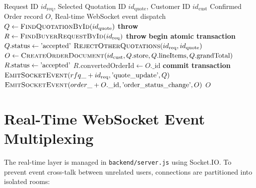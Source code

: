 \begin{algorithm}[H]
\caption{Atomic Concurrency-Controlled Quotation Acceptance}
\label{alg:atomic_acceptance}
\begin{algorithmic}[1]
\Require Request ID $id_{\text{req}}$, Selected Quotation ID $id_{\text{quote}}$, Customer ID $id_{\text{cust}}$
\Ensure Confirmed Order record $O$, Real-time WebSocket event dispatch
\State $Q \gets \textsc{FindQuotationById}(id_{\text{quote}})$
    \State \textbf{throw} 
\EndIf
\State $R \gets \textsc{FindBuyerRequestById}(id_{\text{req}})$
    \State \textbf{throw} 
\EndIf
\State \textbf{begin atomic transaction}
\State $Q.\text{status} \gets \text{\texttt{'accepted'}}$
\State $\textsc{RejectOtherQuotations}(id_{\text{req}}, id_{\text{quote}})$ 
\State $O \gets \textsc{CreateOrderDocument}(id_{\text{cust}}, Q.\text{store}, Q.\text{lineItems}, Q.\text{grandTotal})$
\State $R.\text{status} \gets \text{\texttt{'accepted'}}$
\State $R.\text{convertedOrderId} \gets O.\text{\_id}$
\State \textbf{commit transaction}
\State $\textsc{EmitSocketEvent}(\texttt{rfq\_} + id_{\text{req}}, \text{\texttt{'quote\_update'}}, Q)$
\State $\textsc{EmitSocketEvent}(\texttt{order\_} + O.\text{\_id}, \text{\texttt{'order\_status\_change'}}, O)$
\State \Return $O$
\end{algorithmic}
\end{algorithm}

\section{Real-Time WebSocket Event Multiplexing}

The real-time layer is managed in \texttt{backend/server.js} using Socket.IO. To prevent event cross-talk between unrelated users, connections are partitioned into isolated rooms:

